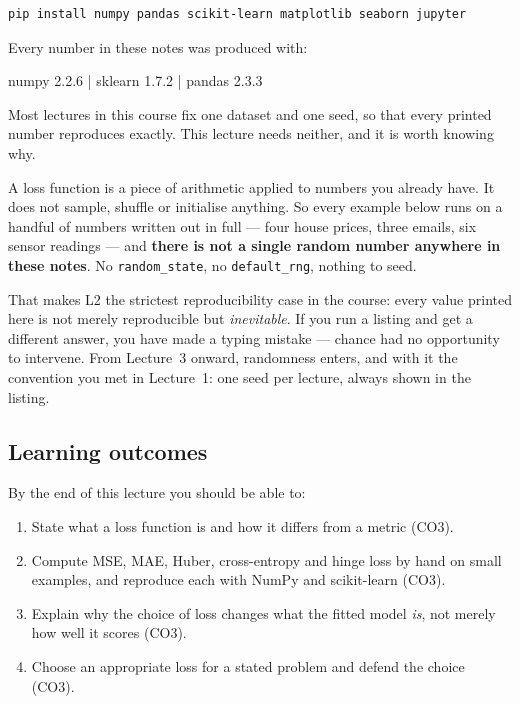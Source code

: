 \documentclass[11pt]{article}
\begin{document}
\begin{lstlisting}
pip install numpy pandas scikit-learn matplotlib seaborn jupyter
\end{lstlisting}

Every number in these notes was produced with:

\begin{codeout}
numpy 2.2.6 | sklearn 1.7.2 | pandas 2.3.3
\end{codeout}

\begin{keyidea}
Most lectures in this course fix one dataset and one seed, so that every
printed number reproduces exactly. This lecture needs neither, and it is worth
knowing why.

A loss function is a piece of arithmetic applied to numbers you already have.
It does not sample, shuffle or initialise anything. So every example below runs
on a handful of numbers written out in full --- four house prices, three emails,
six sensor readings --- and \textbf{there is not a single random number anywhere
in these notes}. No \texttt{random\_state}, no \texttt{default\_rng}, nothing to
seed.

That makes L2 the strictest reproducibility case in the course: every value
printed here is not merely reproducible but \emph{inevitable}. If you run a
listing and get a different answer, you have made a typing mistake --- chance
had no opportunity to intervene. From Lecture~3 onward, randomness enters, and
with it the convention you met in Lecture~1: one seed per lecture, always shown
in the listing.
\end{keyidea}

\subsection{Learning outcomes}

By the end of this lecture you should be able to:

\begin{enumerate}[leftmargin=*]
  \item State what a loss function is and how it differs from a metric (CO3).
  \item Compute MSE, MAE, Huber, cross-entropy and hinge loss by hand on small
    examples, and reproduce each with NumPy and scikit-learn (CO3).
  \item Explain why the choice of loss changes what the fitted model \emph{is},
    not merely how well it scores (CO3).
  \item Choose an appropriate loss for a stated problem and defend the choice
    (CO3).
\end{enumerate}
\end{document}
